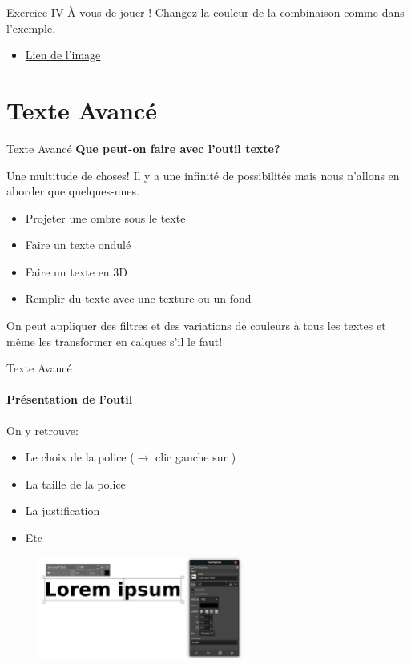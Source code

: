 \documentclass[10pt,svgnames,usenames,table]{beamer}
\newlength\myheight
\newlength\mydepth
\newcommand*\inlinegraphics[1]{%
  \settototalheight\myheight{Xygp}%
  \settodepth\mydepth{Xygp}%
  \raisebox{-\mydepth}{\texttt{[image: \#1]}}%
}
\begin{document}
	\begin{frame}{Exercice IV}
		À vous de jouer ! Changez la couleur de la combinaison comme dans l'exemple.
		\begin{itemize}
			\item \href{http://louvainlinux.github.io/atelier-gimp/src/Images/colours/col5.jpg}{Lien de l'image}
		\end{itemize}
	\end{frame}




\section{Texte Avancé}
	\begin{frame}{Texte Avancé}
		\textbf{Que peut-on faire avec l'outil texte?}	

		Une multitude de choses! Il y a une infinité de possibilités mais nous n'allons en aborder que quelques-unes.
		\begin{itemize}
			\item Projeter une ombre sous le texte
			\item Faire un texte ondulé
			\item Faire un texte en 3D
			\item Remplir du texte avec une texture ou un fond
		\end{itemize}
	
		On peut appliquer des filtres et des variations de couleurs à tous les textes et même les transformer en calques s'il le faut!
	\end{frame}

\begin{frame}{Texte Avancé}
	\framesubtitle{Présentation de l'outil}

	On y retrouve:
	\begin{itemize}
	\item Le choix de la police ($\rightarrow$ clic gauche sur  \inlinegraphics{Images/text/font} )
	\item La taille de la police
	\item La justification
	\item Etc
	\end{itemize}
	
	\begin{figure}
		\centering
		\includegraphics[height=125px]{Images/text/text}
	\end{figure}
	
\end{frame}
\end{document}
